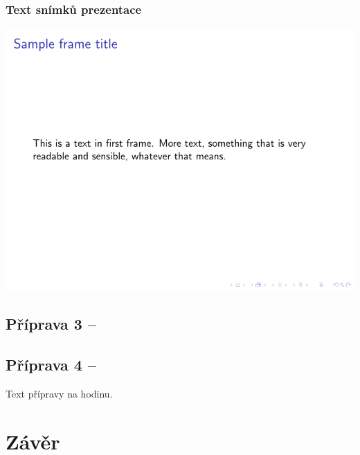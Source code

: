 \documentclass[a4paper, 12pt]{article}
\begin{document}
\subsubsection{Text snímků prezentace}
\includegraphics{IdentityTheftSlides/xdusek21-IdentityTheft.pdf}



\subsection{Příprava 3 -- }

\subsection{Příprava 4 -- }
Text přípravy na hodinu.

\newpage
\section{Závěr}
\end{document}
